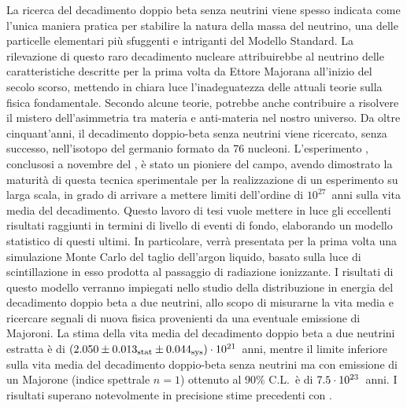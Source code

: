 
La ricerca del decadimento doppio beta senza neutrini viene spesso indicata come l'unica
maniera pratica per stabilire la natura della massa del neutrino, una delle particelle
elementari più sfuggenti e intriganti del Modello Standard. La rilevazione di questo raro
decadimento nucleare attribuirebbe al neutrino delle caratteristiche descritte per la
prima volta da Ettore Majorana all'inizio del secolo scorso, mettendo in chiara luce
l'inadeguatezza delle attuali teorie sulla fisica fondamentale. Secondo alcune teorie,
potrebbe anche contribuire a risolvere il mistero dell'asimmetria tra materia e
anti-materia nel nostro universo. Da oltre cinquant'anni, il decadimento doppio-beta senza
neutrini viene ricercato, senza successo, nell'isotopo del germanio formato da 76
nucleoni. L'esperimento \gerda, conclusosi a novembre del , è stato un pioniere
del campo, avendo dimostrato la maturità di questa tecnica sperimentale per la
realizzazione di un esperimento su larga scala, in grado di arrivare a mettere limiti
dell'ordine di $10^{27}$~anni sulla vita media del decadimento.  Questo lavoro di tesi
vuole mettere in luce gli eccellenti risultati raggiunti in termini di livello di eventi
di fondo, elaborando un modello statistico di questi ultimi. In particolare, verrà
presentata per la prima volta una simulazione Monte Carlo del taglio dell'argon liquido,
basato sulla luce di scintillazione in esso prodotta al passaggio di radiazione
ionizzante. I risultati di questo modello verranno impiegati nello studio della
distribuzione in energia del decadimento doppio beta a due neutrini, allo scopo di
misurarne la vita media e ricercare segnali di nuova fisica provenienti da una eventuale
emissione di Majoroni. La stima della vita media del decadimento doppio beta a due
neutrini estratta è di $(2.050 \pm {0.013}_\text{stat} \pm {0.044}_\text{sys}) \cdot 10^{21}$~anni, mentre il limite inferiore sulla vita media
del decadimento doppio-beta senza neutrini ma con emissione di un Majorone (indice
spettrale $n=1$) ottenuto al 90\% C.L.~è di $7.5 \cdot 10^{23}$~anni. I risultati
superano notevolmente in precisione stime precedenti con \gesix.

